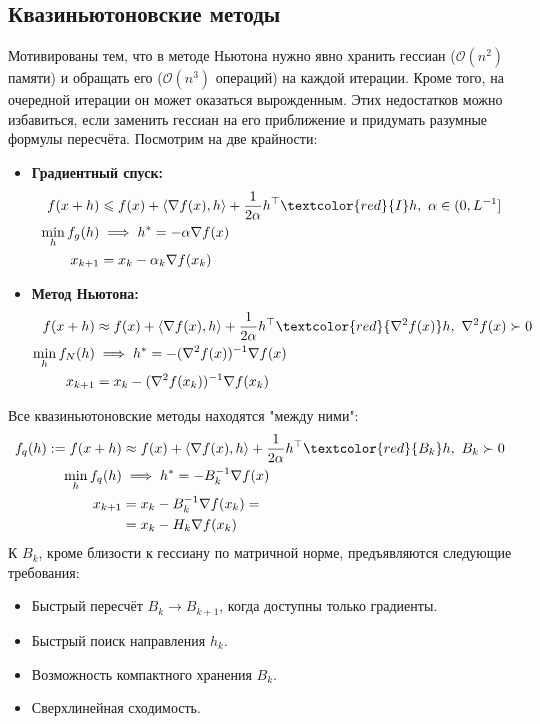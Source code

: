 \documentclass[11pt,a4paper]{report}
\def\le{\leqslant}
\theoremstyle{definition}
\theoremstyle{definition}
\theoremstyle{definition}
\begin{document}
	\subsection{Квазиньютоновские методы}
	Мотивированы тем, что в методе Ньютона нужно явно хранить гессиан ($ \mathcal{O}(n^2) $ памяти) и обращать его ($ \mathcal{O}(n^3) $ операций) на каждой итерации. Кроме того, на очередной итерации он может оказаться вырожденным. Этих недостатков можно избавиться, если заменить гессиан на его приближение и придумать разумные формулы пересчёта. Посмотрим на две крайности:
	\begin{itemize}[$\diamond$]
		\item \textbf{Градиентный спуск:}
		\begin{align*}
			f(x + h) &\le f(x) + \langle \nabla f(x), h \rangle + \frac{1}{2\alpha} h^{\top} \textcolor{red}{I} h,\ \alpha \in (0, L^{-1}]\\
			\min_{h} f_{g}(h) &\implies h^{*} = -\alpha\nabla f(x)\\
			x_{k+1} &= x_{k} - \alpha_k \nabla f(x_k)
		\end{align*}
		\item \textbf{Метод Ньютона:}
		\begin{align*}
			f(x + h) &\approx f(x) + \langle \nabla f(x), h \rangle + \frac{1}{2\alpha} h^{\top} \textcolor{red}{\nabla^2 f(x)} h,\ \nabla^2 f(x) \succ 0 \\
			\min_{h} f_{N}(h) &\implies h^{*} = -(\nabla^2 f(x))^{-1} \nabla f(x)\\
			x_{k+1} &= x_{k} - (\nabla^2 f(x_k))^{-1} \nabla f(x_k) 
		\end{align*}
	\end{itemize}
	Все квазиньютоновские методы находятся "между ними":
	\begin{align*}
		f_{q}(h) := f(x + h) &\approx f(x) + \langle \nabla f(x), h \rangle + \frac{1}{2\alpha} h^{\top} \textcolor{red}{B_k} h,\ B_k \succ 0\\
		\min_{h} f_{q}(h) &\implies h^{*} = -B_k^{-1} \nabla f(x) \\
	x_{k+1} &= x_{k} - B_k^{-1} \nabla f(x_k) =\\
					&= x_{k} - H_k \nabla f(x_k)
	\end{align*}
	К $ B_k $, кроме близости к гессиану по матричной норме, предъявляются следующие требования:
	\begin{itemize}[$ \diamond $]
		\item Быстрый пересчёт $ B_k \to B_{k+1} $, когда доступны только градиенты.
		\item Быстрый поиск направления $ h_k $.
		\item Возможность компактного хранения $ B_k $.
		\item Сверхлинейная сходимость.
	\end{itemize}
\end{document}
